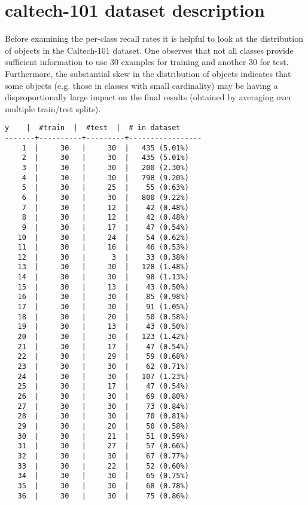 \documentclass[10pt]{article}
\begin{document}
\section*{caltech-101 dataset description}

Before examining the per-class recall rates it is helpful to look at the distribution of objects in the Caltech-101 dataset.
One observes that not all classes provide sufficient information to use 30 examples for training and another 30 for test.  
Furthermore, the substantial skew in the distribution of objects indicates that some objects (e.g. those in classes with small cardinality) may be having a disproportionally large impact on the final results (obtained by averaging over multiple train/test splits).

\begin{Verbatim}[fontsize=\small, commandchars=\\\{\}]
  y    |  #train  |  #test  |  # in dataset 
-------+----------+---------+-----------------
    1  |     30   |     30  |   435 (5.01%)
    2  |     30   |     30  |   435 (5.01%)
    3  |     30   |     30  |   200 (2.30%)
    4  |     30   |     30  |   798 (9.20%)
    5  |     30   |     25  |    55 (0.63%)
    6  |     30   |     30  |   800 (9.22%)
    7  |     30   |     12  |    42 (0.48%)
    8  |     30   |     12  |    42 (0.48%)
    9  |     30   |     17  |    47 (0.54%)
   10  |     30   |     24  |    54 (0.62%)
   11  |     30   |     16  |    46 (0.53%)
   12  |     30   |      3  |    33 (0.38%)
   13  |     30   |     30  |   128 (1.48%)
   14  |     30   |     30  |    98 (1.13%)
   15  |     30   |     13  |    43 (0.50%)
   16  |     30   |     30  |    85 (0.98%)
   17  |     30   |     30  |    91 (1.05%)
   18  |     30   |     20  |    50 (0.58%)
   19  |     30   |     13  |    43 (0.50%)
   20  |     30   |     30  |   123 (1.42%)
   21  |     30   |     17  |    47 (0.54%)
   22  |     30   |     29  |    59 (0.68%)
   23  |     30   |     30  |    62 (0.71%)
   24  |     30   |     30  |   107 (1.23%)
   25  |     30   |     17  |    47 (0.54%)
   26  |     30   |     30  |    69 (0.80%)
   27  |     30   |     30  |    73 (0.84%)
   28  |     30   |     30  |    70 (0.81%)
   29  |     30   |     20  |    50 (0.58%)
   30  |     30   |     21  |    51 (0.59%)
   31  |     30   |     27  |    57 (0.66%)
   32  |     30   |     30  |    67 (0.77%)
   33  |     30   |     22  |    52 (0.60%)
   34  |     30   |     30  |    65 (0.75%)
   35  |     30   |     30  |    68 (0.78%)
   36  |     30   |     30  |    75 (0.86%)

\end{Verbatim}
\end{document}
